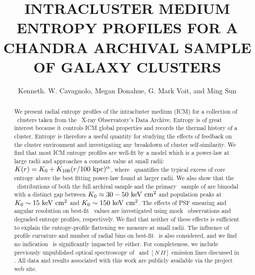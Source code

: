 \documentclass[12pt,preprint]{aastex}
\begin{document}
\title{INTRACLUSTER MEDIUM ENTROPY PROFILES FOR A CHANDRA ARCHIVAL SAMPLE OF GALAXY CLUSTERS}
\author{
  Kenneth. W. Cavagnolo, Megan
  Donahue, G. Mark Voit, and Ming
  Sun}

\begin{abstract}
   We present radial entropy profiles of the intracluster medium (ICM)
   for a collection of \numcluster\ clusters taken from the
   \chandra\ X-ray Observatory's Data Archive. Entropy is of great
   interest because it controls ICM global properties and records the
   thermal history of a cluster. Entropy is therefore a useful
   quantity for studying the effects of feedback on the cluster
   environment and investigating any breakdown of cluster
   self-similarity. We find that most ICM entropy profiles are
   well-fit by a model which is a power-law at large radii and
   approaches a constant value at small radii: $K(r) = K_0 + K_{100}
   (r/100 \mbox{\ensuremath{\mathrm{~kpc}}})^{\alpha}$, where \kna\ quantifies the typical excess
   of core entropy above the best fitting power-law found at larger
   radii. We also show that the \kna\ distributions of both the full
   archival sample and the primary \hifl\ sample of \citet{hiflugcs1}
   are bimodal with a distinct gap between $K_0 \approx 30-50 \mathrm{\mbox{\ensuremath{\mathrm{~keV}}} \mathrm{\mbox{\ensuremath{\mathrm{~cm}}}^2}}$
   and population peaks at $K_0 \sim 15 \mathrm{\mbox{\ensuremath{\mathrm{~keV}}} \mathrm{\mbox{\ensuremath{\mathrm{~cm}}}^2}}$ and $K_0 \sim 150
   \mathrm{\mbox{\ensuremath{\mathrm{~keV}}} \mathrm{\mbox{\ensuremath{\mathrm{~cm}}}^2}}$. The effects of PSF smearing and angular resolution on
   best-fit \kna\ values are investigated using mock
   \chandra\ observations and degraded entropy profiles,
   respectively. We find that neither of these effects is sufficient
   to explain the entropy-profile flattening we measure at small
   radii. The influence of profile curvature and number of radial bins
   on best-fit \kna\ is also considered, and we find no indication
   \kna\ is significantly impacted by either. For completeness, we
   include previously unpublished optical spectroscopy of \halpha\ and
   $[N~II]$ emission lines discussed in \citet{haradent}. All data and
   results associated with this work are publicly available via the
   project web site.
\end{abstract}
\end{document}

